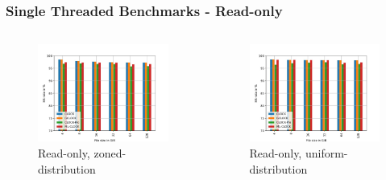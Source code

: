 \documentclass[
	aspectratio=169,
	compress,
]{beamer}
\newcommand{\navframetitle}[1]{\frametitle{#1\hfill{\footnotesize\lastsection{}}}}
\begin{document}
\begin{frame}[fragile]
	\navframetitle{Single Threaded Benchmarks - Read-only}

	\begin{columns}
		\begin{column}{0.5\textwidth}
			\begin{figure}
        		\includegraphics[width=\textwidth]{randread_zoned.jpg}
        		\caption{Read-only, zoned-distribution}
			\end{figure}
		\end{column}
		\begin{column}{0.5\textwidth}
			\begin{figure}[ht]
    			\centering
    			\includegraphics[width=\textwidth]{randread_uniform.jpg}
        		\caption{Read-only, uniform-distribution}
			\end{figure}			
		\end{column}
	\end{columns}
\end{frame}
\end{document}
